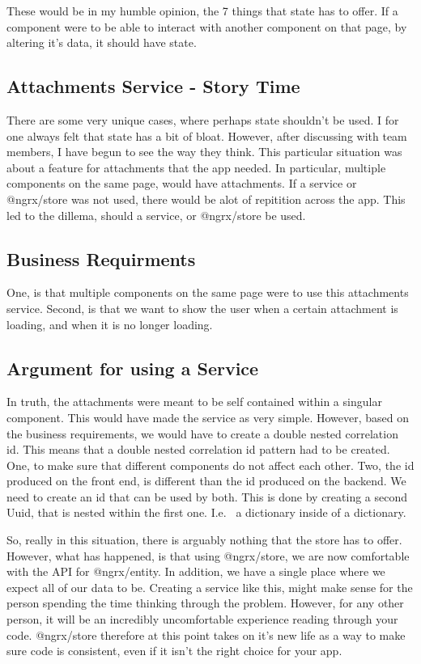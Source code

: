 These would be in my humble opinion, the 7 things that state has to offer. If a
component were to be able to interact with another component on that page, by
altering it's data, it should have state.

\subsection{ Attachments Service - Story Time }
There are some very unique cases, where perhaps state shouldn't be used. I for
one always felt that state has a bit of bloat. However, after discussing with
team members, I have begun to see the way they think. This particular situation
was about a feature for attachments that the app needed. In particular,
multiple components on the same page, would have attachments. If a service or
@ngrx/store was not used, there would be alot of repitition across the app. This
led to the dillema, should a service, or @ngrx/store be used.

\subsection{ Business Requirments }
One, is that multiple components on the same page were to use this attachments
service. Second, is that we want to show the user when a certain attachment is
loading, and when it is no longer loading.

\subsection{ Argument for using a Service }
In truth, the attachments were meant to be self contained within a singular
component. This would have made the service as very simple. However, based on
the business requirements, we would have to create a double nested correlation
id. This means that a double nested correlation id pattern had to be created.
One, to make sure that different components do not affect each other. Two, the
id produced on the front end, is different than the id produced on the backend.
We need to create an id that can be used by both. This is done by creating a
second Uuid, that is nested within the first one. I.e. \ a dictionary inside of a
dictionary.

So, really in this situation, there is arguably nothing that the store has to
offer. However, what has happened, is that using @ngrx/store, we are now
comfortable with the API for @ngrx/entity. In addition, we have a single place
where we expect all of our data to be. Creating a service like this, might make
sense for the person spending the time thinking through the problem. However,
for any other person, it will be an incredibly uncomfortable experience reading
through your code. @ngrx/store therefore at this point takes on it's new life
as a way to make sure code is consistent, even if it isn't the right choice for
your app.
